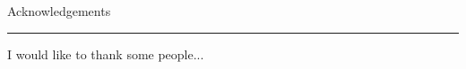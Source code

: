 \pagestyle{plain}


{\Large Acknowledgements}\\
\hrule
\vskip 5mm
I would like to thank some people...
